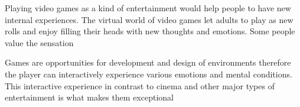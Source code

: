 
Playing video games as a kind of entertainment would help people to have new internal
experiences. The virtual world of video games let adults to play as new rolls and enjoy filling
their heads with new thoughts and emotions. Some people value
the sensation

Games are opportunities for development and design of environments therefore
the player can interactively experience various emotions and mental conditions.
This interactive experience in contrast to cinema
and other major types of entertainment is what makes them exceptional

